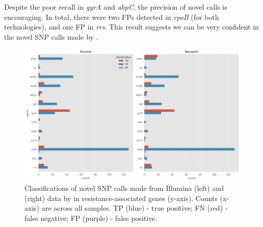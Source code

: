 Despite the poor recall in \textit{gyrA} and \textit{ahpC}, the precision of novel \drprg{} calls is encouraging. In total, there were two FPs detected in \textit{rpoB} (for both technologies), and one \ont{} FP in \textit{rrs}. This result suggests we can be very confident in the novel SNP calls made by \drprg{}.

\begin{figure}
\begin{center}
\includegraphics[width=0.90\columnwidth]{Chapter3/Figs/novel_classifications.png}
\caption{{Classifications of novel SNP calls made from Illumina (left) and \ont{} (right) data by \drprg{} in resistance-associated genes (y-axis). Counts (x-axis) are across all samples. TP (blue) - true positive; FN (red) - false negative; FP (purple) - false positive.
{\label{fig:novel-classifications}}
}}
\end{center}
\end{figure}

